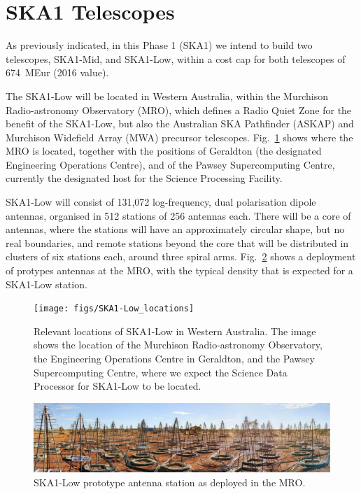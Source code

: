 \documentclass[a4paper,
               biblatex,       %
               keeplastbox,    %
               ]{jacow-2_1}    %
\begin{document}

\section{SKA1 Telescopes} %
\label{sec:ska1_telescopes}

As previously indicated, in this Phase 1 (SKA1) we intend to build two telescopes, SKA1-Mid, and SKA1-Low, within a cost cap for both telescopes of 674~MEur (2016 value).

The SKA1-Low will be located in Western Australia, within the Murchison Radio-astronomy Observatory (MRO), which defines a Radio Quiet Zone for the benefit of the SKA1-Low, but also the Australian SKA Pathfinder (ASKAP) and Murchison Widefield Array (MWA) precursor telescopes. Fig.~\ref{fig:figs_SKA1-Low_locations} shows where the MRO is located, together with the positions of Geraldton (the designated Engineering Operations Centre), and of the Pawsey Supercomputing Centre, currently the designated host for the Science Processing Facility.

SKA1-Low will consist of 131,072 log-frequency, dual polarisation dipole antennas, organised in 512 stations of 256 antennas each. There will be a core of antennas, where the stations will have an approximately circular shape, but no real boundaries, and remote stations beyond the core that will be distributed in clusters of six  stations each, around three spiral arms. Fig.~\ref{fig:figs_SKA1-Low_prototype_station} shows a deployment of protypes antennas at the MRO, with the typical density that is expected for a SKA1-Low station.

\begin{figure}[!htb]
  \centering
    \texttt{[image: figs/SKA1-Low\_locations]}
  \caption{Relevant locations of SKA1-Low in Western Australia. The image shows the location of the Murchison Radio-astronomy Observatory,  the Engineering Operations Centre in Geraldton, and the Pawsey Supercomputing Centre, where we expect the Science Data Processor for SKA1-Low to be located.}
  \label{fig:figs_SKA1-Low_locations}
\end{figure}

\begin{figure}[!tbh]
  \centering
    \includegraphics[width=\textwidth]{figs/SKA1-Low_prototype_station}
  \caption{SKA1-Low prototype antenna station as deployed in the MRO.}
  \label{fig:figs_SKA1-Low_prototype_station}
\end{figure}
\end{document}
